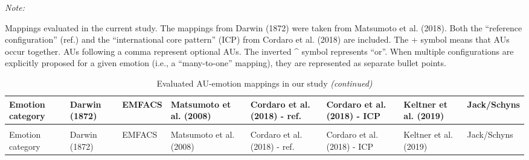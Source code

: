 \documentclass[11pt,american,a4paper,oneside,]{memoir} %
\begin{document}
\begin{ThreePartTable}
\begin{TableNotes}[para]
\item \textit{Note: } 
\item Mappings evaluated in the current study. The mappings from Darwin (1872) were taken from Matsumoto et al. (2018). Both the “reference configuration” (ref.) and the “international core pattern” (ICP) from Cordaro et al. (2018) are included. The + symbol means that AUs occur together. AUs following a comma represent optional AUs. The inverted \textasciicircum{} symbol represents “or”. When multiple configurations are explicitly proposed for a given emotion (i.e., a “many-to-one” mapping), they are represented as separate bullet points.
\end{TableNotes}
\begin{longtabu} to 
\caption{\label{tab:tab-hka-1}Evaluated AU-emotion mappings in our study}\\
\toprule
Emotion category & Darwin (1872) & EMFACS & Matsumoto et al. (2008) & Cordaro et al. (2018) - ref. & Cordaro et al. (2018) - ICP & Keltner et al. (2019) & Jack/Schyns\\
\midrule
\endfirsthead
\caption[]{\label{tab:tab-hka-1}Evaluated AU-emotion mappings in our study \textit{(continued)}}\\
\toprule
Emotion category & Darwin (1872) & EMFACS & Matsumoto et al. (2008) & Cordaro et al. (2018) - ref. & Cordaro et al. (2018) - ICP & Keltner et al. (2019) & Jack/Schyns\\
\midrule
\endhead


\end{longtabu}
\end{ThreePartTable}
\end{document}
